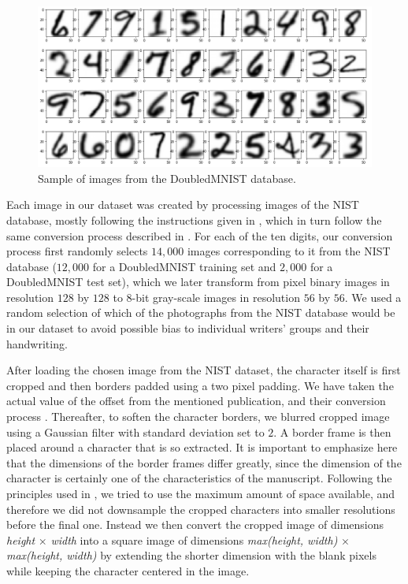 \documentclass[eng]{simposium}
\begin{document}
\begin{figure}[!ht] 
  \centering 
  \includegraphics[width=1\textwidth]{sample_from_nist.png} 
  \caption{Sample of images from the DoubledMNIST database.} 
  \label{fig:nist_sample} 
\end{figure} 

Each image in our dataset was created by processing images of the NIST database,  
mostly following the instructions given in \cite{1}, which in turn follow the same conversion process described in \cite{8}.  
For each of the ten digits, our conversion process first randomly selects $14,000$ images corresponding to it from the NIST  
database ($12,000$ for a DoubledMNIST training set and $2,000$ for a DoubledMNIST test set), which we later transform  
from pixel binary images in resolution $128$ by $128$ to 8-bit gray-scale images in resolution $56$ by $56$.  
We used a random selection of which of the photographs from the NIST database would be in our dataset to avoid possible  
bias to individual writers' groups and their handwriting.  

After loading the chosen image from the NIST dataset, the character itself is first cropped and then borders padded using a two pixel padding.  
We have taken the actual value of the offset from the mentioned publication, and their conversion process \cite{1}.  
Thereafter, to soften the character borders, we blurred cropped image using a Gaussian filter with standard deviation set to $2$.  
A border frame is then placed around a character that is so extracted.  
It is important to emphasize here that the dimensions of the border frames differ greatly, since the dimension of the  
character is certainly one of the characteristics of the manuscript.  
Following the principles used in \cite{1}, we tried to use the maximum amount of space available, and  
therefore we did not downsample the cropped characters into smaller resolutions before the final one.  
Instead we then convert the cropped image of dimensions \textit{height} $\times$ \textit{width} into a square image of dimensions  
\textit{max(height, width)} $\times$ \textit{max(height, width)} by extending the shorter dimension with the blank pixels  
while keeping the character centered in the image.  
\end{document}
